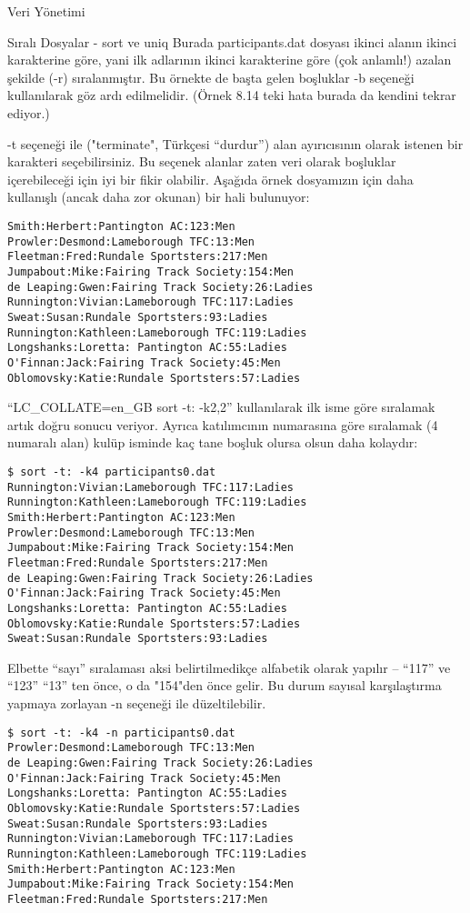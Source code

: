 \begin{section}{Veri Yönetimi}
\begin{subsection}{Sıralı Dosyalar - sort ve uniq}
Burada participants.dat dosyası ikinci alanın ikinci karakterine göre, yani ilk adlarının ikinci karakterine göre (çok anlamlı!) azalan şekilde (-r) sıralanmıştır. Bu örnekte de başta gelen boşluklar -b seçeneği kullanılarak göz ardı edilmelidir. (Örnek 8.14 teki hata burada da kendini tekrar ediyor.)

-t seçeneği ile ("terminate", Türkçesi “durdur”) alan ayırıcısının olarak istenen bir karakteri seçebilirsiniz. Bu seçenek alanlar zaten veri olarak boşluklar içerebileceği için iyi bir fikir olabilir. Aşağıda örnek dosyamızın için daha kullanışlı (ancak daha zor okunan) bir hali bulunuyor:

\begin{verbatim}
Smith:Herbert:Pantington AC:123:Men
Prowler:Desmond:Lameborough TFC:13:Men
Fleetman:Fred:Rundale Sportsters:217:Men
Jumpabout:Mike:Fairing Track Society:154:Men
de Leaping:Gwen:Fairing Track Society:26:Ladies
Runnington:Vivian:Lameborough TFC:117:Ladies
Sweat:Susan:Rundale Sportsters:93:Ladies
Runnington:Kathleen:Lameborough TFC:119:Ladies
Longshanks:Loretta: Pantington AC:55:Ladies
O'Finnan:Jack:Fairing Track Society:45:Men
Oblomovsky:Katie:Rundale Sportsters:57:Ladies
\end{verbatim}

“LC\_COLLATE=en\_GB sort -t: -k2,2” kullanılarak ilk isme göre sıralamak artık doğru sonucu veriyor. Ayrıca katılımcının numarasına göre sıralamak (4 numaralı alan) kulüp isminde kaç tane boşluk olursa olsun daha kolaydır:

\begin{verbatim}
$ sort -t: -k4 participants0.dat
Runnington:Vivian:Lameborough TFC:117:Ladies
Runnington:Kathleen:Lameborough TFC:119:Ladies
Smith:Herbert:Pantington AC:123:Men
Prowler:Desmond:Lameborough TFC:13:Men
Jumpabout:Mike:Fairing Track Society:154:Men
Fleetman:Fred:Rundale Sportsters:217:Men
de Leaping:Gwen:Fairing Track Society:26:Ladies
O'Finnan:Jack:Fairing Track Society:45:Men
Longshanks:Loretta: Pantington AC:55:Ladies
Oblomovsky:Katie:Rundale Sportsters:57:Ladies
Sweat:Susan:Rundale Sportsters:93:Ladies
\end{verbatim}

Elbette “sayı” sıralaması aksi belirtilmedikçe alfabetik olarak yapılır – “117” ve “123” “13” ten önce, o da "154"den önce gelir. Bu durum sayısal karşılaştırma yapmaya zorlayan -n seçeneği ile düzeltilebilir.

\begin{verbatim}
$ sort -t: -k4 -n participants0.dat
Prowler:Desmond:Lameborough TFC:13:Men
de Leaping:Gwen:Fairing Track Society:26:Ladies
O'Finnan:Jack:Fairing Track Society:45:Men
Longshanks:Loretta: Pantington AC:55:Ladies
Oblomovsky:Katie:Rundale Sportsters:57:Ladies
Sweat:Susan:Rundale Sportsters:93:Ladies
Runnington:Vivian:Lameborough TFC:117:Ladies
Runnington:Kathleen:Lameborough TFC:119:Ladies
Smith:Herbert:Pantington AC:123:Men
Jumpabout:Mike:Fairing Track Society:154:Men
Fleetman:Fred:Rundale Sportsters:217:Men
\end{verbatim}


\end{subsection}
\end{section}
